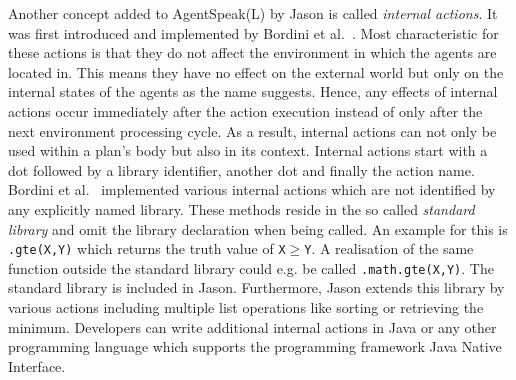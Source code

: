 Another concept added to AgentSpeak(L) by Jason is called \emph{internal actions}.
It was first introduced and implemented by Bordini et al.~\cite{bordini_agentspeak_2002}.
Most characteristic for these actions is that they do not affect the environment in which the agents are located in.
This means they have no effect on the external world but only on the internal states of the agents as the name suggests.
Hence, any effects of internal actions occur immediately after the action execution instead of only after the next environment processing cycle.
As a result, internal actions can not only be used within a plan's body but also in its context. %
Internal actions start with a dot followed by a library identifier, another dot and finally the action name.
Bordini et al.~\cite{bordini_agentspeak_2002} implemented various internal actions which are not identified by any explicitly named library.
These methods reside in the so called \emph{standard library} and omit the library declaration when being called.
An example for this is \texttt{.gte(X,Y)} which returns the truth value of \texttt{X}$\geq$\texttt{Y}.
A realisation of the same function outside the standard library could e.g. be called \texttt{.math.gte(X,Y)}.
The standard library is included in Jason.
Furthermore, Jason extends this library by various actions including multiple list operations like sorting or retrieving the minimum.
Developers can write additional internal actions in Java or any other programming language which supports the programming framework Java Native Interface. %


